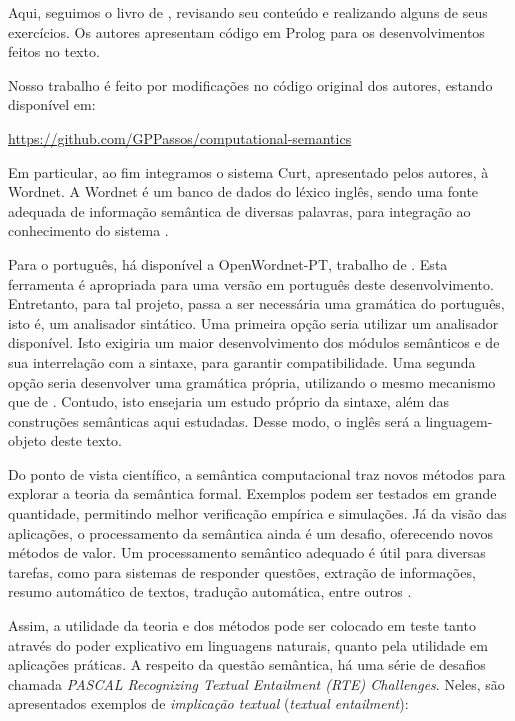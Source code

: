 
	Aqui, seguimos o livro de \citet{BlackburnBos:2005}, revisando seu conteúdo e realizando alguns de seus exercícios. Os autores apresentam código em Prolog para os desenvolvimentos feitos no texto.

	Nosso trabalho é feito por modificações no código original dos autores, estando disponível em:
	
	\url{https://github.com/GPPassos/computational-semantics} 
	
	Em particular, ao fim integramos o sistema Curt, apresentado pelos autores, à Wordnet. A Wordnet é um banco de dados do léxico inglês, sendo uma fonte adequada de informação semântica de diversas palavras, para integração ao conhecimento do sistema \citep{Fellbaum:wordnet}.
	
	Para o português, há disponível a OpenWordnet-PT, trabalho de \citet{wordnetPT}. Esta ferramenta é apropriada para uma versão em português deste desenvolvimento. Entretanto, para tal projeto, passa a ser necessária uma gramática do português, isto é, um analisador sintático. Uma primeira opção seria utilizar um analisador disponível. Isto exigiria um maior desenvolvimento dos módulos semânticos e de sua interrelação com a sintaxe, para garantir compatibilidade. Uma segunda opção seria desenvolver uma gramática própria, utilizando o mesmo mecanismo que de \citet{BlackburnBos:2005}. Contudo, isto ensejaria um estudo próprio da sintaxe, além das construções semânticas aqui estudadas. Desse modo, o inglês será a linguagem-objeto deste texto. 


	Do ponto de vista científico, a semântica computacional traz novos métodos para explorar a teoria da semântica formal. Exemplos podem ser testados em grande quantidade, permitindo melhor verificação empírica e simulações. Já da visão das aplicações, o processamento da semântica ainda é um desafio, oferecendo novos métodos de valor. Um processamento semântico adequado é útil para diversas tarefas, como para sistemas de responder questões, extração de informações, resumo automático de textos, tradução automática, entre outros \citep[pp.~1--2,10--14]{TextEntBook}.


	Assim, a utilidade da teoria e dos métodos pode ser colocado em teste tanto através do poder explicativo em linguagens naturais, quanto pela utilidade em aplicações práticas. A respeito da questão semântica, há uma série de desafios chamada \textit{PASCAL Recognizing Textual Entailment (RTE) Challenges}. Neles, são apresentados exemplos de  \textsl{implicação textual}  (\textit{textual entailment}):
	
